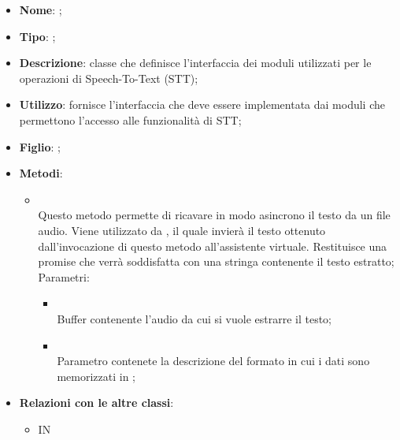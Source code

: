 \begin{itemize}
	\item \textbf{Nome}: ;
	\item \textbf{Tipo}: ;
	\item \textbf{Descrizione}: classe che definisce l'interfaccia dei moduli utilizzati per le operazioni di Speech-To-Text (STT);
	\item \textbf{Utilizzo}: fornisce l'interfaccia che deve essere implementata dai moduli che permettono l'accesso alle funzionalità di STT;
	\item \textbf{Figlio}: ;
	\item \textbf{Metodi}:
	\begin{itemize}
		\item[]  \\
		Questo metodo permette di ricavare in modo asincrono il testo da un file audio. Viene utilizzato da , il quale invierà il testo ottenuto dall'invocazione di questo metodo all'assistente virtuale. Restituisce una promise che verrà soddisfatta con una stringa contenente il testo estratto;\\
		Parametri:
		\begin{itemize}
			\item {} \\
			Buffer contenente l'audio da cui si vuole estrarre il testo;
			\item {} \\
			Parametro contenete la descrizione del formato in cui i dati sono memorizzati in ;
		\end{itemize}
	\end{itemize}
	\item \textbf{Relazioni con le altre classi}:
	\begin{itemize}
		\item IN \hyperlink{VocalAPI_label}{}
	\end{itemize}
\end{itemize}
\FloatBarrier

